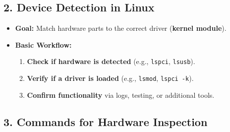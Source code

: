 \documentclass[12pt,a4paper]{report}
\begin{document}
\subsection*{2. Device Detection in Linux}
\begin{itemize}
    \item \textbf{Goal:} Match hardware parts to the correct driver (\textbf{kernel module}).
    \item \textbf{Basic Workflow:}
    \begin{enumerate}
        \item \textbf{Check if hardware is detected} (e.g., \texttt{lspci}, \texttt{lsusb}).
        \item \textbf{Verify if a driver is loaded} (e.g., \texttt{lsmod}, \texttt{lspci -k}).
        \item \textbf{Confirm functionality} via logs, testing, or additional tools.
    \end{enumerate}
\end{itemize}

\subsection*{3. Commands for Hardware Inspection}
\end{document}

